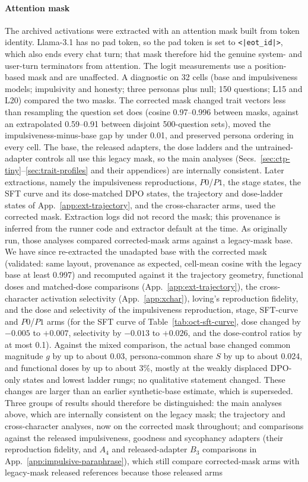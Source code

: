 \documentclass{article}
\begin{document}
\paragraph{Attention mask}
The archived activations were extracted with an attention mask built from token identity. Llama-3.1 has no pad token, so the pad token is set to \texttt{<|eot\_id|>}, which also ends every chat turn; that mask therefore hid the genuine system- and user-turn terminators from attention. The logit measurements use a position-based mask and are unaffected. A diagnostic on 32 cells (base and impulsiveness models; impulsivity and honesty; three personas plus null; 150 questions; L15 and L20) compared the two masks. The corrected mask changed trait vectors less than resampling the question set does (cosine 0.97--0.996 between masks, against an extrapolated 0.59--0.91 between disjoint 500-question sets), moved the impulsiveness-minus-base gap by under 0.01, and preserved persona ordering in every cell. The base, the released adapters, the dose ladders and the untrained-adapter controls all use this legacy mask, so the main analyses (Secs.~\ref{sec:ctp-tiny}--\ref{sec:trait-profiles} and their appendices) are internally consistent. Later extractions, namely the impulsiveness reproductions, $P0$/$P1$, the stage states, the SFT curve and its dose-matched DPO states, the trajectory and dose-ladder states of App.~\ref{app:ext-trajectory}, and the cross-character arms, used the corrected mask. Extraction logs did not record the mask; this provenance is inferred from the runner code and extractor default at the time. As originally run, those analyses compared corrected-mask arms against a legacy-mask base. We have since re-extracted the unadapted base with the corrected mask (validated: same layout, provenance as expected, cell-mean cosine with the legacy base at least 0.997) and recomputed against it the trajectory geometry, functional doses and matched-dose comparisons (App.~\ref{app:ext-trajectory}), the cross-character activation selectivity (App.~\ref{app:xchar}), loving's reproduction fidelity, and the dose and selectivity of the impulsiveness reproduction, stage, SFT-curve and $P0$/$P1$ arms (for the SFT curve of Table~\ref{tab:oct-sft-curve}, dose changed by $-0.005$ to $+0.007$, selectivity by $-0.013$ to $+0.026$, and the dose-control ratios by at most 0.1). Against the mixed comparison, the actual base changed common magnitude $g$ by up to about 0.03, persona-common share $S$ by up to about 0.024, and functional doses by up to about 3\%, mostly at the weakly displaced DPO-only states and lowest ladder rungs; no qualitative statement changed. These changes are larger than an earlier synthetic-base estimate, which is superseded. Three groups of results should therefore be distinguished: the main analyses above, which are internally consistent on the legacy mask; the trajectory and cross-character analyses, now on the corrected mask throughout; and comparisons against the released impulsiveness, goodness and sycophancy adapters (their reproduction fidelity, and $A_4$ and released-adapter $B_3$ comparisons in App.~\ref{app:impulsive-paraphrase}), which still compare corrected-mask arms with legacy-mask released references because those released arms 
\end{document}
